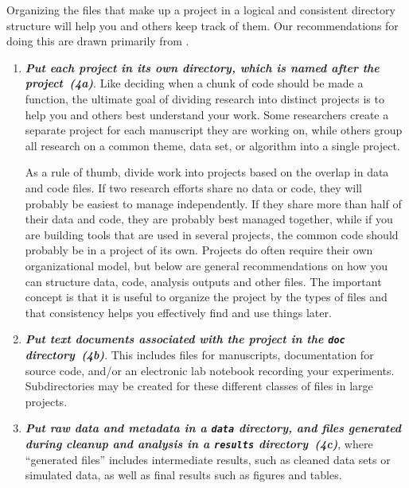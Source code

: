 \documentclass[10pt,letterpaper]{article}
\newcommand{\practice}[2]{\textbf{\emph{{#2}~({#1})}}}
\begin{document}
Organizing the files that make up a project in a logical and
consistent directory structure will help you and others keep track of
them.  Our recommendations for doing this are drawn primarily from
\cite{noble2009,gentzkow2014}.

\begin{enumerate}

\item

  \practice{4a}{Put each project in its own directory, which is named
  after the project}.  Like deciding when a chunk of code should be
  made a function, the ultimate goal of dividing research into
  distinct projects is to help you and others best understand your
  work. Some researchers create a separate project for each manuscript
  they are working on, while others group all research on a common
  theme, data set, or algorithm into a single project.

  As a rule of thumb, divide work into projects based on the overlap
  in data and code files. If two research efforts share no data or
  code, they will probably be easiest to manage independently. If they
  share more than half of their data and code, they are probably best
  managed together, while if you are building tools that are used in
  several projects, the common code should probably be in a project of
  its own. Projects do often require their own organizational model,
  but below are general recommendations on how you can structure data,
  code, analysis outputs and other files. The important concept is
  that it is useful to organize the project by the types of files and
  that consistency helps you effectively find and use things later.

\item

  \practice{4b}{Put text documents associated with the project in the
  \texttt{doc} directory}. This includes files for manuscripts,
  documentation for source code, and/or an electronic lab notebook
  recording your experiments.  Subdirectories may be created for these
  different classes of files in large projects.

\item

  \practice{4c}{Put raw data and metadata in a \texttt{data}
  directory, and files generated during cleanup and analysis in a
  \texttt{results} directory}, where ``generated files'' includes
  intermediate results, such as cleaned data sets or simulated data,
  as well as final results such as figures and tables.


\end{enumerate}
\end{document}
